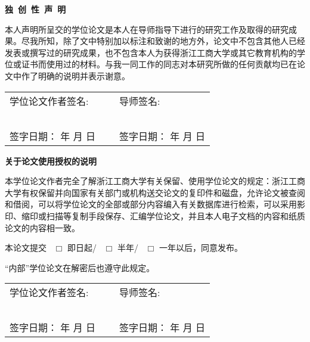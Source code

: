 {}
{
\songti
{}

\begin{center}
    \textbf{ \heiti 独~创~性~声~明}
\end{center}

本人声明所呈交的学位论文是本人在导师指导下进行的研究工作及取得的研究成果。尽我所知，除了文中特别加以标注和致谢的地方外，论文中不包含其他人已经发表或撰写过的研究成果，也不包含本人为获得浙江工商大学或其它教育机构的学位或证书而使用过的材料。与我一同工作的同志对本研究所做的任何贡献均已在论文中作了明确的说明并表示谢意。

\vskip 50pt

\begin{center}
     \songti 
    \begin{tabularx}{\linewidth}{ X c X }
        学位论文作者签名: & ~ &导师签名: \\
        ~ & ~ & ~ \\
        签字日期： \qquad 年 \qquad 月 \qquad 日 & ~ &
        签字日期： \qquad 年 \qquad 月 \qquad 日
    \end{tabularx}
\end{center}

\vskip 60pt

\begin{center}
    \textbf{  \heiti 关于论文使用授权的说明}
\end{center}


本学位论文作者完全了解浙江工商大学有关保留、使用学位论文的规定：浙江工商大学有权保留并向国家有关部门或机构送交论文的复印件和磁盘，允许论文被查阅和借阅，可以将学位论文的全部或部分内容编入有关数据库进行检索，可以采用影印、缩印或扫描等复制手段保存、汇编学位论文，并且本人电子文档的内容和纸质论文的内容相一致。

本论文提交~ $\Box$ 即日起/~ $\Box$ 半年/~ $\Box$ 一年以后，同意发布。

“内部”学位论文在解密后也遵守此规定。
\vskip 50pt

\begin{center}
     \songti 
    \begin{tabularx}{\linewidth}{ X c X }
        学位论文作者签名: & ~ &导师签名: \\
        ~ & ~ & ~ \\
        签字日期： \qquad 年 \qquad 月 \qquad 日 & ~ &
        签字日期： \qquad 年 \qquad 月 \qquad 日
    \end{tabularx}
\end{center}

\vfill

}